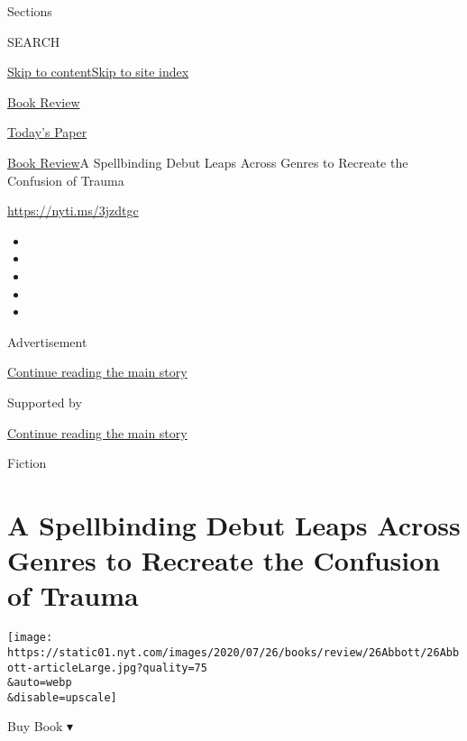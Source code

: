 Sections

SEARCH

\protect\hyperlink{site-content}{Skip to
content}\protect\hyperlink{site-index}{Skip to site index}

\href{https://www.nytimes.com/section/books/review}{Book Review}

\href{https://myaccount.nytimes.com/auth/login?response_type=cookie\&client_id=vi}{}

\href{https://www.nytimes.com/section/todayspaper}{Today's Paper}

\href{/section/books/review}{Book Review}\textbar{}A Spellbinding Debut
Leaps Across Genres to Recreate the Confusion of Trauma

\url{https://nyti.ms/3jzdtgc}

\begin{itemize}
\item
\item
\item
\item
\item
\end{itemize}

Advertisement

\protect\hyperlink{after-top}{Continue reading the main story}

Supported by

\protect\hyperlink{after-sponsor}{Continue reading the main story}

Fiction

\hypertarget{a-spellbinding-debut-leaps-across-genres-to-recreate-the-confusion-of-trauma}{%
\section{A Spellbinding Debut Leaps Across Genres to Recreate the
Confusion of
Trauma}\label{a-spellbinding-debut-leaps-across-genres-to-recreate-the-confusion-of-trauma}}

\texttt{[image: https://static01.nyt.com/images/2020/07/26/books/review/26Abbott/26Abbott-articleLarge.jpg?quality=75\\\&auto=webp\\\&disable=upscale]}

Buy Book ▾

